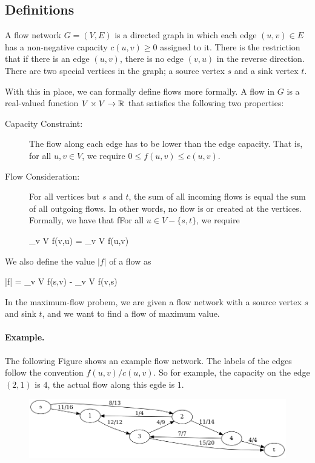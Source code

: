 
\subsection{Definitions}

A flow network $G = (V,E)$ is a directed graph in which each edge $(u,v) \in E$ has a non-negative capacity $c(u,v) \geq 0$ assigned to it. There is the restriction that if there is an edge $(u,v)$, there is no edge $(v,u)$ in the reverse direction. There are two special vertices in the graph; a source vertex $s$ and a sink vertex $t$.

With this in place, we can formally define flows more formally. A flow in $G$ is a real-valued function $V \times V \rightarrow \mathbb{R}$ that satisfies the following two properties:

\begin{description}
\item [Capacity Constraint:] The flow along each edge has to be lower than the edge capacity. That is, for all $u,v \in V$, we require $0 \leq f(u,v) \leq c(u,v)$.
\item [Flow Consideration:] For all vertices but $s$ and $t$, the sum of all incoming flows is equal the sum of all outgoing flows. In other words, no flow is or created at the vertices. Formally, we have that fFor all $u \in V - \{s,t\}$, we require

\bee
\sum_{v \in V} f(v,u) = \sum_{v \in V} f(u,v)
\eee

\end{description}

We also define the value $|f|$ of a flow as

\bee
|f| = \sum_{v \in V} f(s,v) - \sum_{v \in V} f(v,s)
\eee

In the maximum-flow probem, we are given a flow network with a source vertex $s$ and sink $t$, and we want to find a flow of maximum value.

\paragraph{Example.} The following Figure shows an example flow network. The labels of the edges follow the convention $f(u,v)/c(u,v)$. So for example, the capacity on the edge $(2,1)$ is $4$, the actual flow along this egde is $1$. 

\begin{figure}[H]
\centering
\includegraphics[scale=0.45]{images/max_flow_01.png}
\end{figure}


